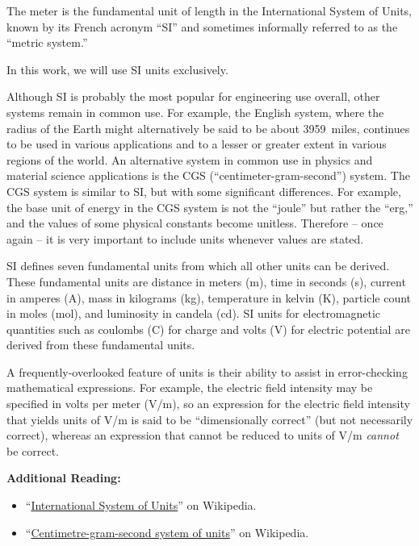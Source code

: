 The meter is the fundamental unit of length in the International System of Units, known by its French acronym ``SI'' 
and sometimes informally referred to as the ``metric system.''  

\begin{mdframed}[backgroundcolor=yellow!20,nobreak=true] 
In this work, we will use SI units exclusively.
\end{mdframed}

Although SI is probably the most popular for engineering use overall, other systems remain in common use.  
For example, the English system, 
where the radius of the Earth might alternatively be said to be about 3959~miles, continues to be used in various applications and to a lesser or greater extent in various regions of the world.
An alternative system in common use in physics and material science applications is the CGS
(``centimeter-gram-second'') system. The CGS system is similar to SI, but with some significant differences. For example, the base unit of energy in the CGS system is not the ``joule'' but rather the ``erg,'' and the values of some physical constants become unitless. Therefore -- once again -- it is very important to include units whenever values are stated.

SI defines seven fundamental units from which all other units can be derived.  These fundamental units are
distance in meters (m),
time in seconds (s), 
current in amperes (A),
mass in kilograms (kg),
temperature in kelvin (K),
particle count in moles (mol), and
luminosity in candela (cd).
SI units for electromagnetic quantities such as coulombs (C) for charge and volts (V) for electric potential are derived from these fundamental units.

A frequently-overlooked feature of units is their ability to assist in error-checking mathematical expressions.
For example, the electric field intensity may be specified in volts per meter (V/m), so an expression for the electric field intensity that yields units of V/m is said to be ``dimensionally correct'' (but not necessarily correct), whereas an expression that cannot be reduced to units of V/m \emph{cannot} be correct. 


{\bf Additional Reading:}
\begin{itemize}
\item ``\href{https://en.wikipedia.org/wiki/International_System_of_Units}{International System of Units}'' on Wikipedia.
\item ``\href{https://en.wikipedia.org/wiki/Centimetre-gram-second_system_of_units}{Centimetre-gram-second system of units}'' on Wikipedia.
\end{itemize}

